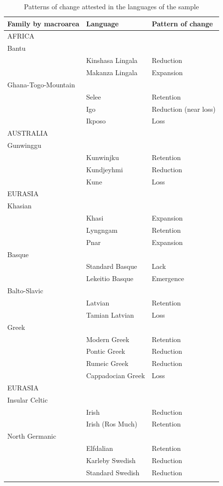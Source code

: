 \documentclass[output=collectionpaper]{langsci/langscibook}
\begin{document}
\begin{table}[htp!] \footnotesize
\caption{Patterns of change attested in the languages of the sample}
\label{tb:patterns}
 \begin{tabular}{lll}  %
  \lsptoprule
Family by macroarea & Language & Pattern of change\\
\midrule
AFRICA &&\\
\midrule
Bantu & &\\
&Kinshasa Lingala& Reduction\\
& Makanza Lingala& Expansion\\
\midrule
Ghana-Togo-Mountain && \\
& Selee& Retention\\
&Igo& Reduction (near loss)\\
& Ikposo& Loss\\
\midrule
AUSTRALIA &&\\
\midrule
 Gunwinggu && \\
&Kunwinjku &Retention\\
&Kundjeyhmi& Reduction \\
&Kune& Loss \\
\midrule
EURASIA &&\\
\midrule
Khasian&  &\\
&Khasi& Expansion\\
&Lyngngam& Retention\\
&Pnar&Expansion\\
\midrule
Basque &&  \\
&Standard Basque&Lack\\
&Lekeitio Basque&Emergence\\
\midrule
Balto-Slavic&&\\
& Latvian&Retention\\
& Tamian Latvian&Loss\\
\midrule
Greek&&\\
&Modern Greek&Retention \\
&Pontic Greek & Reduction\\
&Rumeic Greek &Reduction\\
&Cappadocian Greek& Loss \\
\midrule
EURASIA &&\\
\midrule
Insular Celtic &&\\
& Irish& Reduction\\
& Irish (Ros Much)&Retention\\
\midrule
North Germanic &&\\
&Elfdalian& Retention\\
&Karleby Swedish & Reduction\\
&Standard Swedish& Reduction\\
 \lspbottomrule
 \end{tabular}
 \end{table}
\end{document}
